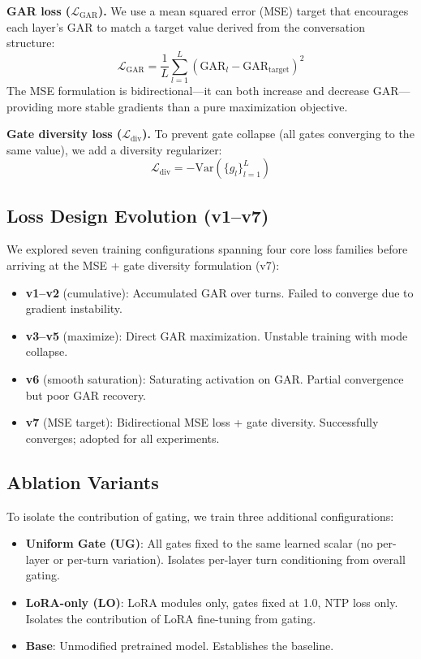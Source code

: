 \documentclass[11pt,a4paper]{article}
\begin{document}
\textbf{GAR loss ($\mathcal{L}_{\text{GAR}}$).}
We use a mean squared error (MSE) target that encourages each layer's GAR to match a target value derived from the conversation structure:
\begin{equation}
    \mathcal{L}_{\text{GAR}} = \frac{1}{L} \sum_{l=1}^{L} \left( \text{GAR}_l - \text{GAR}_{\text{target}} \right)^2
\end{equation}
The MSE formulation is bidirectional---it can both increase and decrease GAR---providing more stable gradients than a pure maximization objective.

\textbf{Gate diversity loss ($\mathcal{L}_{\text{div}}$).}
To prevent gate collapse (all gates converging to the same value), we add a diversity regularizer:
\begin{equation}
    \mathcal{L}_{\text{div}} = -\text{Var}(\{g_l\}_{l=1}^{L})
\end{equation}

\subsection{Loss Design Evolution (v1--v7)}

We explored seven training configurations spanning four core loss families before arriving at the MSE + gate diversity formulation (v7):
\begin{itemize}
    \item \textbf{v1--v2} (cumulative): Accumulated GAR over turns. Failed to converge due to gradient instability.
    \item \textbf{v3--v5} (maximize): Direct GAR maximization. Unstable training with mode collapse.
    \item \textbf{v6} (smooth saturation): Saturating activation on GAR. Partial convergence but poor GAR recovery.
    \item \textbf{v7} (MSE target): Bidirectional MSE loss + gate diversity. Successfully converges; adopted for all experiments.
\end{itemize}

\subsection{Ablation Variants}

To isolate the contribution of gating, we train three additional configurations:
\begin{itemize}
    \item \textbf{Uniform Gate (UG)}: All gates fixed to the same learned scalar (no per-layer or per-turn variation). Isolates per-layer turn conditioning from overall gating.
    \item \textbf{LoRA-only (LO)}: LoRA modules only, gates fixed at 1.0, NTP loss only. Isolates the contribution of LoRA fine-tuning from gating.
    \item \textbf{Base}: Unmodified pretrained model. Establishes the baseline.
\end{itemize}
\end{document}
